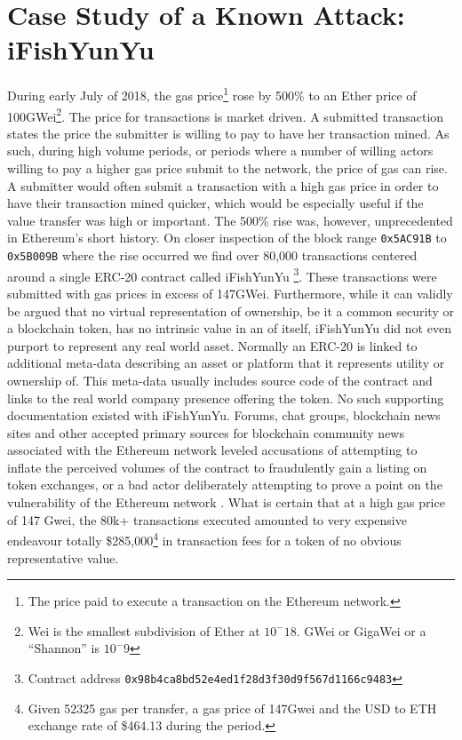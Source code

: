\documentclass[conference]{IEEEtran}
\begin{document}
\section{Case Study of a Known Attack: iFishYunYu}
During early July of 2018, the gas price\footnote{The price paid to execute a transaction on the Ethereum network.} rose by 500\% to an Ether price of 100GWei\footnote{Wei is the smallest subdivision of Ether at $10^-18$.  GWei or GigaWei or a ``Shannon'' is $10^-9$}.  The price for transactions is market driven.  A submitted transaction states the price the submitter is willing to pay to have her transaction mined. As such, during high volume periods, or periods where a number of willing actors willing to pay a higher gas price submit to the network, the price of gas can rise.  A submitter would often submit a transaction with a high gas price in order to have their transaction mined quicker, which would be especially useful if the value transfer was high or important. The 500\% rise was, however, unprecedented in Ethereum's short history.  On closer inspection of the block range {\tiny\texttt{0x5AC91B}} to {\tiny\texttt{0x5B009B}} where the rise occurred we find over 80,000  transactions centered around a single ERC-20 contract called iFishYunYu \footnote{Contract address \tiny\texttt{0x98b4ca8bd52e4ed1f28d3f30d9f567d1166c9483}}.  These transactions were submitted with gas prices in excess of 147GWei.  Furthermore, while it can validly be argued that no virtual representation of ownership, be it a common security or a blockchain token, has no intrinsic value in an of itself, iFishYunYu did not even purport to represent any real world asset.  Normally an ERC-20 is linked to additional meta-data describing an asset or platform that it represents utility or ownership of.  This meta-data usually includes source code of the contract and links to the real world company presence offering the token. No such supporting documentation existed with iFishYunYu.  Forums, chat groups, blockchain news sites and other accepted primary sources for blockchain community news \cite{li2019cryptocurrency,kamps2018moon} associated with the Ethereum network leveled accusations of attempting to inflate the perceived volumes of the contract to fraudulently gain a listing on token exchanges, or a bad actor deliberately attempting to prove a point on the vulnerability of the Ethereum network \cite{ifishweb1,ifishweb2}.  What is certain that at a high gas price of 147 Gwei, the 80k+ transactions executed amounted to very expensive endeavour totally \$285,000\footnote{Given 52325 gas per transfer, a gas price of 147Gwei and the USD to ETH exchange rate of \$464.13 during the period.} in transaction fees for a token of no obvious representative value. 
\end{document}
